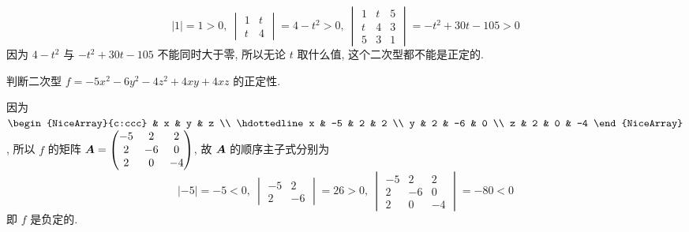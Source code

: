 \begin{solution}
\begin{enumerate}[label=(\arabic{*})]
              $$|1|=1>0,~\begin{vmatrix}
                      1 & t \\
                      t & 4
                  \end{vmatrix}=4-t^2>0,~\begin{vmatrix}
                      1 & t & 5 \\
                      t & 4 & 3 \\
                      5 & 3 & 1
                  \end{vmatrix}=-t^2+30t-105>0$$
              因为 $4-t^2$ 与 $-t^2+30t-105$ 不能同时大于零, 所以无论 $t$ 取什么值, 这个二次型都不能是正定的.
    \end{enumerate}
\end{solution}

\begin{example}
    判断二次型 $f=-5x^2-6y^2-4z^2+4xy+4xz$ 的正定性.
\end{example}
\begin{solution}
    因为 $\begin{NiceArray}{c:ccc}
        & x  & y  & z  \\ \hdottedline
            x & -5 & 2  & 2  \\
            y & 2  & -6 & 0  \\
            z & 2  & 0  & -4
    \end{NiceArray}$, 所以 $f$ 的矩阵 $\vb*{A}=\begin{pmatrix}
            -5 & 2  & 2  \\
            2  & -6 & 0  \\
            2  & 0  & -4
        \end{pmatrix}$, 故 $\vb*{A}$ 的顺序主子式分别为
    $$|-5|=-5<0,~\begin{vmatrix}
            -5 & 2  \\
            2  & -6
        \end{vmatrix}=26>0,~\begin{vmatrix}
            -5 & 2  & 2  \\
            2  & -6 & 0  \\
            2  & 0  & -4
        \end{vmatrix}=-80<0$$
    即 $f$ 是负定的.
\end{solution}

